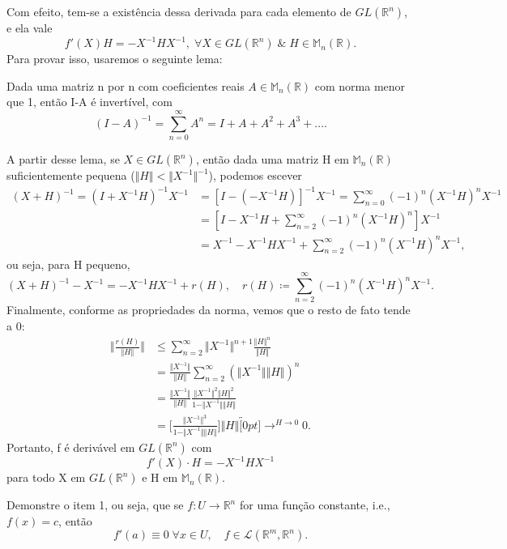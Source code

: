 \documentclass[../analysisII_notes.tex]{subfiles}
\begin{document}
\begin{example}
\begin{itemize}
		      Com efeito, tem-se a existência dessa derivada para cada elemento de \(GL(\mathbb{R}^{n})\), e ela vale
		      \[
			      f'(X)H = -X^{-1}HX^{-1},\; \forall X\in GL(\mathbb{R}^{n})\;\&\; H\in \mathbb{M}_{n}(\mathbb{R}).
		      \]
		      Para provar isso, usaremos o seguinte lema:
		      \begin{lemma*}
			      Dada uma matriz n por n com coeficientes reais \(A\in \mathbb{M}_{n}(\mathbb{R})\) com norma menor que 1, então I-A é invertível, com
			      \[
				      (I-A)^{-1} = \sum\limits_{n=0}^{\infty}A^{n} = I + A + A^{2} + A^{3} +\dotsc.
			      \]
		      \end{lemma*}
		      A partir desse lema, se \(X\in GL(\mathbb{R}^{n})\), então dada uma matriz H em \(\mathbb{M}_{n}(\mathbb{R})\) suficientemente pequena (\(\Vert H \Vert<\Vert X^{-1} \Vert^{-1}\)), podemos escever
		      \begin{align*}
			      (X+H)^{-1}=(I+X^{-1}H)^{-1}X^{-1} & =[I-(-X^{-1}H)]^{-1}X^{-1}=\sum\limits_{n=0}^{\infty}(-1)^{n}(X^{-1}H)^{n}X^{-1} \\
			                                        & =[I-X^{-1}H + \sum\limits_{n=2}^{\infty}(-1)^{n}(X^{-1}H)^{n}]X^{-1}             \\
			                                        & =X^{-1}-X^{-1}HX^{-1}+\sum\limits_{n=2}^{\infty}(-1)^{n}(X^{-1}H)^{n}X^{-1},
		      \end{align*}
		      ou seja, para H pequeno,
		      \[
			      (X+H)^{-1}-X^{-1}=-X^{-1}HX^{-1}+r(H),\quad r(H)\coloneqq \sum\limits_{n=2}^{\infty}(-1)^{n}(X^{-1}H)^{n}X^{-1}.
		      \]
		      Finalmente, conforme as propriedades da norma, vemos que o resto de fato tende a 0:
		      \begin{align*}
			      \biggl\Vert \frac{r(H)}{\Vert H \Vert} \biggr\Vert & \leq \sum\limits_{n=2}^{\infty}\Vert X^{-1} \Vert^{n+1}\frac{\Vert H \Vert^{n}}{\Vert H \Vert}                                             \\
			                                                         & = \frac{\Vert X^{-1} \Vert}{\Vert H \Vert}\sum\limits_{n=2}^{\infty}(\Vert X^{-1} \Vert\Vert H \Vert)^{n}                                  \\
			                                                         & = \frac{\Vert X^{-1} \Vert}{\Vert H \Vert} \frac{\Vert X^{-1} \Vert^{2}\Vert H \Vert^{2}}{1-\Vert X^{-1} \Vert\Vert H \Vert}               \\
			                                                         & =\biggl[\frac{\Vert X^{-1} \Vert^{3}}{1-\Vert X^{-1} \Vert\Vert H \Vert}\biggr]\Vert H \Vert \overbracket[0pt]{\longrightarrow}^{H\to 0}0.
		      \end{align*}
		      Portanto, f é derivável em \(GL(\mathbb{R}^{n})\) com
		      \[
			      f'(X)\cdot H=-X^{-1}HX^{-1}
		      \]
		      para todo X em \(GL(\mathbb{R}^{n})\) e H em \(\mathbb{M}_{n}(\mathbb{R}).\)
	\end{itemize}
\end{example}
\begin{exr}
	Demonstre o item 1, ou seja, que se \(f:U\rightarrow \mathbb{R}^{n}\) for uma função constante, i.e., \(f(x) = c\), então
	\[
		f'(a)\equiv 0 \; \forall x\in U,\quad f\in \mathcal{L}(\mathbb{R}^{m}, \mathbb{R}^{n}).
	\]
\end{exr}
\end{document}
